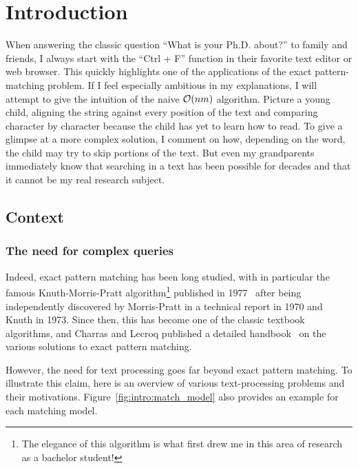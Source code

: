 \chapter*{Introduction}\label{chap:intro}

When answering the classic question ``What is your Ph.D. about?'' to family and friends, I always start with the ``Ctrl + F'' function in their favorite text editor or web browser. This quickly highlights one of the applications of the exact pattern-matching problem. If I feel especially ambitious in my explanations, I will attempt to give the intuition of the naive $\mathcal{O}(nm)$ algorithm. Picture a young child, aligning the string against every position of the text and comparing character by character because the child has yet to learn how to read. To give a glimpse at a more complex solution, I comment on how, depending on the word, the child may try to skip portions of the text. But even my grandparents immediately know that searching in a text has been possible for decades and that it cannot be my real research subject.

\section{Context}
\subsection{The need for complex queries} 

Indeed, exact pattern matching has been long studied, with in particular the famous Knuth-Morris-Pratt algorithm\footnote{The elegance of this algorithm is what first drew me in this area of research as a bachelor student!} published in 1977~\cite{KMP} after being independently discovered by Morris-Pratt in a technical report in 1970 and Knuth in 1973. Since then, this has become one of the classic textbook algorithms, and Charras and Lecroq published a detailed handbook~\cite{charras2004handbook} on the various solutions to exact pattern matching.



However, the need for text processing goes far beyond exact pattern matching. To illustrate this claim, here is an overview of various text-processing problems and their motivations. Figure~\ref{fig:intro:match_model} also provides an example for each matching model.

